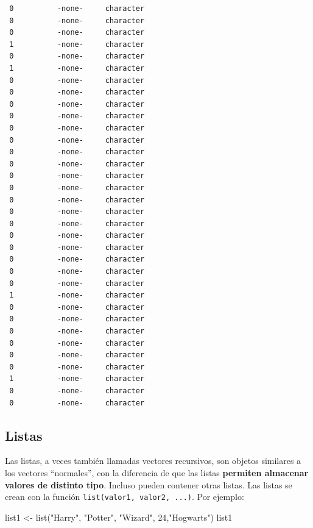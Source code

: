 \documentclass[
  letterpaper,
  DIV=11,
  numbers=noendperiod]{scrreprt}
\newenvironment{Shaded}{\begin{snugshade}}{\end{snugshade}}
\newcommand{\DecValTok}[1]{\textcolor[rgb]{0.68,0.00,0.00}{#1}}
\newcommand{\FunctionTok}[1]{\textcolor[rgb]{0.28,0.35,0.67}{#1}}
\newcommand{\NormalTok}[1]{\textcolor[rgb]{0.00,0.23,0.31}{#1}}
\newcommand{\OtherTok}[1]{\textcolor[rgb]{0.00,0.23,0.31}{#1}}
\newcommand{\StringTok}[1]{\textcolor[rgb]{0.13,0.47,0.30}{#1}}
\begin{document}
\begin{verbatim}
 0          -none-     character                  
 0          -none-     character                  
 0          -none-     character                  
 1          -none-     character                  
 0          -none-     character                  
 1          -none-     character                  
 0          -none-     character                  
 0          -none-     character                  
 0          -none-     character                  
 0          -none-     character                  
 0          -none-     character                  
 0          -none-     character                  
 0          -none-     character                  
 0          -none-     character                  
 0          -none-     character                  
 0          -none-     character                  
 0          -none-     character                  
 0          -none-     character                  
 0          -none-     character                  
 0          -none-     character                  
 0          -none-     character                  
 0          -none-     character                  
 0          -none-     character                  
 0          -none-     character                  
 1          -none-     character                  
 0          -none-     character                  
 0          -none-     character                  
 0          -none-     character                  
 0          -none-     character                  
 0          -none-     character                  
 0          -none-     character                  
 1          -none-     character                  
 0          -none-     character                  
 0          -none-     character                  
\end{verbatim}

\hypertarget{listas}{%
\subsection{Listas}\label{listas}}

Las listas, a veces también llamadas vectores recursivos, son objetos
similares a los vectores ``normales'', con la diferencia de que las
listas \textbf{permiten almacenar valores de distinto tipo}. Incluso
pueden contener otras listas. Las listas se crean con la función
\texttt{list(valor1,\ valor2,\ ...)}. Por ejemplo:

\begin{Shaded}
\begin{Highlighting}[]
\NormalTok{list1 }\OtherTok{\textless{}{-}} \FunctionTok{list}\NormalTok{(}\StringTok{"Harry"}\NormalTok{, }\StringTok{"Potter"}\NormalTok{, }\StringTok{"Wizard"}\NormalTok{, }\DecValTok{24}\NormalTok{,}\StringTok{"Hogwarts"}\NormalTok{)}
\NormalTok{list1}
\end{Highlighting}
\end{Shaded}
\end{document}
